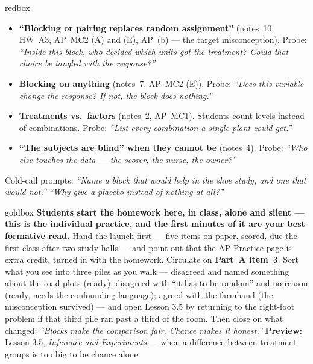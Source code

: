\documentclass[10pt]{article}
\begin{document}
\boxguard
\begin{skillbox}{redbox}
\begin{itemize}[leftmargin=1.2em, nosep]
  \item \textbf{``Blocking or pairing replaces random assignment''} (notes~10, HW~A3, AP~MC2
        (A) and (E), AP~(b) --- the target misconception). Probe: \emph{``Inside this block,
        who decided which units got the treatment? Could that choice be tangled with the
        response?''}
  \item \textbf{Blocking on anything} (notes~7, AP~MC2 (E)). Probe: \emph{``Does this variable
        change the response? If not, the block does nothing.''}
  \item \textbf{Treatments vs.\ factors} (notes~2, AP~MC1). Students count levels instead of
        combinations. Probe: \emph{``List every combination a single plant could get.''}
  \item \textbf{``The subjects are blind'' when they cannot be} (notes~4). Probe: \emph{``Who
        else touches the data --- the scorer, the nurse, the owner?''}
\end{itemize}
Cold-call prompts: \emph{``Name a block that would help in the shoe study, and one that would
not.''} \quad \emph{``Why give a placebo instead of nothing at all?''}
\end{skillbox}

\boxguard
\begin{skillbox}{goldbox}
\textbf{Students start the homework here, in class, alone and silent --- this is the individual
practice, and the first minutes of it are your best formative read.} Hand the launch first ---
five items on paper, scored, due the first class after two study halls --- and point out that
the AP Practice page is extra credit, turned in with the homework. Circulate on \textbf{Part~A
item~3}. Sort what you see into three piles as you walk --- disagreed and named something about
the road plots (ready); disagreed with ``it has to be random'' and no reason (ready, needs the
confounding language); agreed with the farmhand (the misconception survived) --- and open
Lesson 3.5 by returning to the right-foot problem if that third pile ran past a third of the
room. Then close on what changed: \emph{``Blocks make the comparison fair. Chance makes it
honest.''} \textbf{Preview:} Lesson 3.5, \emph{Inference and Experiments} --- when a
difference between treatment groups is too big to be chance alone.
\end{skillbox}
\end{document}
